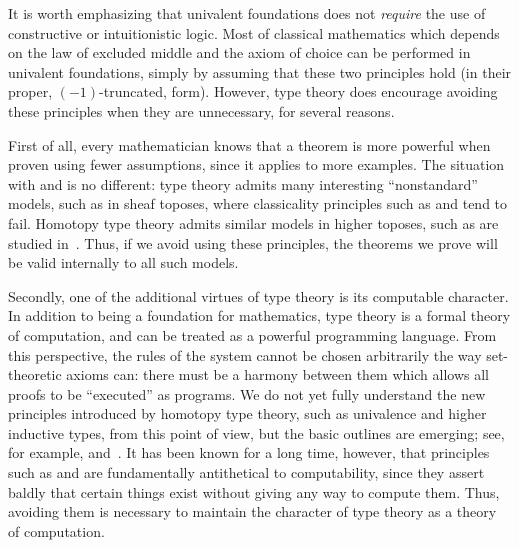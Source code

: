 It is worth emphasizing that univalent foundations does not \emph{require} the use of constructive or intuitionistic logic.
Most of classical mathematics which depends on the law of excluded middle and the axiom of choice can be performed in univalent foundations, simply by assuming that these two principles hold (in their proper, $(-1)$-truncated, form).
However, type theory does encourage avoiding these principles when they are unnecessary, for several reasons.

First of all, every mathematician knows that a theorem is more powerful when proven using fewer assumptions, since it applies to more examples.
The situation with \choice{} and \LEM{} is no different:
type theory admits many interesting ``nonstandard'' models, such as in sheaf toposes, where classicality principles such as \choice{} and \LEM{} tend to fail.
Homotopy type theory admits similar models in higher toposes, such as are studied in~\cite{ToenVezzosi02,Rezk05,lurie:higher-topoi}.
Thus, if we avoid using these principles, the theorems we prove will be valid internally to all such models.

Secondly, one of the additional virtues of type theory is its computable character.
In addition to being a foundation for mathematics, type theory is a formal theory of computation, and can be treated as a powerful programming language.
From this perspective, the rules of the system cannot be chosen arbitrarily the way set-theoretic axioms can: there must be a harmony between them which allows all proofs to be ``executed'' as programs.
We do not yet fully understand the new principles introduced by homotopy type theory, such as univalence and higher inductive types, from
this point of view, but the basic outlines are emerging; see, for example,  and~\cite{lh:canonicity}.
It has been known for a long time, however, that principles such as \choice{} and \LEM{} are fundamentally antithetical to computability, since they assert baldly that certain things exist without giving any way to compute them.
Thus, avoiding them is necessary to maintain the character of type theory as a theory of computation.

